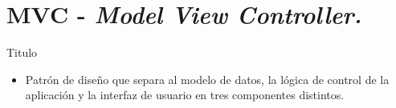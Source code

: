 \section{MVC - \emph{Model View Controller.}}
\begin{frame}{Titulo}
\begin{block}{}
	\begin{itemize}
		\item Patr\'on de diseño que separa al modelo de datos, la lógica de control de la aplicaci\'on y la interfaz de usuario en tres componentes distintos.
	\end{itemize}
\end{block}
\end{frame}



%
